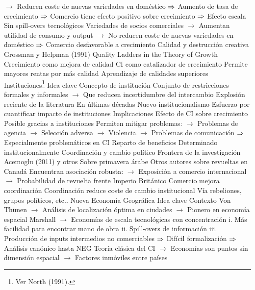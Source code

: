 \documentclass{nuevotema}
\begin{document}
\begin{esquemal}
				\4[] $\to$ Reducen coste de nuevas variedades en doméstico
				\4[] $\Rightarrow$ Aumento de tasa de crecimiento
				\4[] $\Rightarrow$ Comercio tiene efecto positivo sobre crecimiento
				\4[] $\Rightarrow$ Efecto escala
				\4 Sin spill-overs tecnológicos
				\4[] Variedades de socios comerciales
				\4[] $\to$ Aumentan utilidad de consumo y output
				\4[] $\to$ No reducen coste de nuevas variedades en doméstico
				\4[] $\Rightarrow$ Comercio desfavorable a crecimiento
			\3 Calidad y destrucción creativa
				\4 Grossman y Helpman (1991)
				\4[] Quality Ladders in the Theory of Growth
				\4 Crecimiento como mejora de calidad
				\4 CI como catalizador de crecimiento
				\4[] Permite mayores rentas por más calidad
				\4[] Aprendizaje de calidades superiores
		\2 Instituciones\footnote{Ver North (1991).}
			\3 Idea clave
				\4 Concepto de institución
				\4[] Conjunto de restricciones formales y informales
				\4[] $\to$ Que reducen incertidumbre del intercambio
				\4 Explosión reciente de la literatura
				\4[] En últimas décadas
				\4[] Nuevo institucionalismo
				\4[] Esfuerzo por cuantificar impacto de instituciones
			\3 Implicaciones
				\4 Efecto de CI sobre crecimiento
				\4[] Posible gracias a instituciones
				\4[] Permiten mitigar problemas:
				\4[] $\to$ Problemas de agencia
				\4[] $\to$ Selección adversa
				\4[] $\to$ Violencia
				\4[] $\to$ Problemas de comunicación
				\4[] $\Rightarrow$ Especialmente problemáticos en CI
				\4 Reparto de beneficios
				\4[] Determinado institucionalmente
			\3 Coordinación y cambio político
				\4 Frontera de la investigación
				\4 Acemoglu (2011) y otros
				\4[] Sobre primavera árabe
				\4 Otros autores sobre revueltas en Canadá
				\4[] Encuentran asociación robusta:
				\4[] $\to$ Exposición a comercio internacional
				\4[] $\to$ Probabilidad de revuelta frente Imperio Británico
				\4 Comercio mejora coordinación
				\4 Coordinación reduce coste de cambio institucional
				\4[] Vía rebeliones, grupos políticos, etc..
		\2 Nueva Economía Geográfica
			\3 Idea clave
				\4 Contexto
				\4[] Von Thünen
				\4[] $\to$ Análisis de localización óptima en ciudades
				\4[] $\to$ Pionero en economía espacial
				\4[] Marshall
				\4[] $\to$ Economías de escala tecnológicas con concentración
				\4[] i. Más facilidad para encontrar mano de obra
				\4[] ii. Spill-overs de información
				\4[] iii. Producción de inputs intermedios no comerciables
				\4[] $\Rightarrow$ Difícil formalización
				\4[] $\Rightarrow$ Análisis canónico hasta NEG
				\4[] Teoría clásica del CI
				\4[] $\to$ Economías son puntos sin dimensión espacial
				\4[] $\to$ Factores inmóviles entre países

\end{esquemal}
\end{document}
